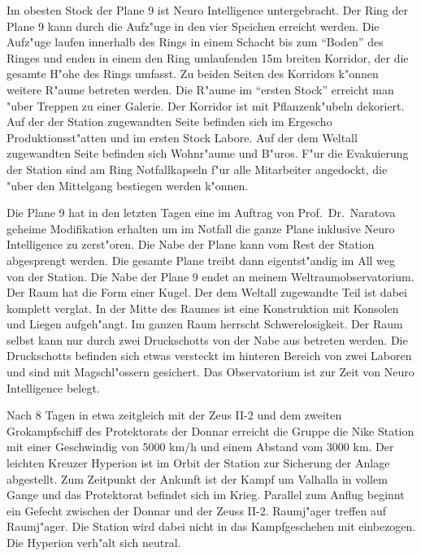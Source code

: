 Im obesten Stock der Plane 9 ist Neuro Intelligence untergebracht. Der Ring der Plane 9 kann durch die Aufz"uge in den vier Speichen erreicht werden. Die Aufz"uge laufen innerhalb des Rings in einem Schacht bis zum "`Boden"' des Ringes und enden in einem den Ring umlaufenden 15m breiten Korridor, der die gesamte H"ohe des Rings umfasst. Zu beiden Seiten des Korridors k"onnen weitere R"aume betreten werden. Die R"aume im "`ersten Stock"' erreicht man "uber Treppen zu einer Galerie. Der Korridor ist mit Pflanzenk"ubeln dekoriert. Auf der der Station zugewandten Seite befinden sich im Ergescho\3 Produktionsst"atten und im ersten Stock Labore. Auf der dem Weltall zugewandten Seite befinden sich Wohnr"aume und B"uros. F"ur die Evakuierung der Station sind am Ring Notfallkapseln f"ur alle Mitarbeiter angedockt, die "uber den Mittelgang bestiegen werden k"onnen.

Die Plane 9 hat in den letzten Tagen eine im Auftrag von Prof.~Dr.~Naratova geheime Modifikation erhalten um im Notfall die ganze Plane inklusive Neuro Intelligence zu zerst"oren. Die Nabe der Plane kann vom Rest der Station abgesprengt werden. Die gesamte Plane treibt dann eigentst"andig im All weg von der Station. Die Nabe der Plane 9 endet an meinem Weltraumobservatorium. Der Raum hat die Form einer Kugel. Der dem Weltall zugewandte Teil ist dabei komplett vergla\3t. In der Mitte des Raumes ist eine Konstruktion mit Konsolen und Liegen aufgeh"angt. Im ganzen Raum herrscht Schwerelosigkeit. Der Raum selbst kann nur durch zwei Druckschotts von der Nabe aus betreten werden. Die Druckschotts befinden sich etwas versteckt im hinteren Bereich von zwei Laboren und sind mit Magschl"ossern gesichert. Das Observatorium ist zur Zeit von Neuro Intelligence belegt. 



Nach 8 Tagen in etwa zeitgleich mit der Zeus II-2 und dem zweiten Gro\3kampfschiff des Protektorats der Donnar erreicht die Gruppe die Nike Station mit einer Geschwindig von 5000 km/h und einem Abstand vom 3000 km. Der leichten Kreuzer Hyperion ist im Orbit der Station zur Sicherung der Anlage abgestellt. Zum Zeitpunkt der Ankunft ist der Kampf um Valhalla in vollem Gange und das Protektorat befindet sich im Krieg. Parallel zum Anflug beginnt ein Gefecht zwischen der Donnar und der Zeuss II-2. Raumj"ager treffen auf Raumj"ager. Die Station wird dabei nicht in das Kampfgeschehen mit einbezogen. Die Hyperion verh"alt sich neutral.

